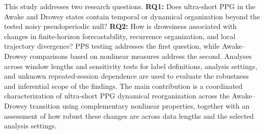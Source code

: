 This study addresses two research questions. \textbf{RQ1:} Does ultra-short PPG in the Awake and Drowsy states contain temporal or dynamical organization beyond the tested noisy pseudoperiodic null? \textbf{RQ2:} How is drowsiness associated with changes in finite-horizon forecastability, recurrence organization, and local trajectory divergence? PPS testing addresses the first question, while Awake--Drowsy comparisons based on nonlinear measures address the second. Analyses across window lengths and sensitivity tests for label definitions, analysis settings, and unknown repeated-session dependence are used to evaluate the robustness and inferential scope of the findings. The main contribution is a coordinated characterization of ultra-short PPG dynamical reorganization across the Awake--Drowsy transition using complementary nonlinear properties, together with an assessment of how robust these changes are across data lengths and the selected analysis settings.